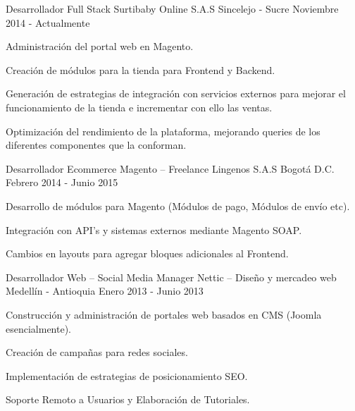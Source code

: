 

\begin{cventries}

  \cventry
    {Desarrollador Full Stack} %
    {Surtibaby Online S.A.S} %
    {Sincelejo - Sucre} %
    {Noviembre 2014 - Actualmente} %
    {
      \begin{cvitems} %
        \item {Administración del portal web en Magento.}
        \item {Creación de módulos para la tienda para Frontend y Backend.}
        \item {Generación de estrategias de integración con servicios externos para mejorar el
funcionamiento de la tienda e incrementar con ello las ventas.}
		\item {Optimización del rendimiento de la plataforma, mejorando queries de los diferentes
componentes que la conforman.}
      \end{cvitems}
    }

  \cventry
    {Desarrollador Ecommerce Magento – Freelance} %
    {Lingenos S.A.S} %
    {Bogotá D.C.} %
    {Febrero 2014 - Junio 2015} %
    {
      \begin{cvitems} %
        \item {Desarrollo de módulos para Magento (Módulos de pago, Módulos de envío etc).}
        \item {Integración con API's y sistemas externos mediante Magento SOAP.}
        \item {Cambios en layouts para agregar bloques adicionales al Frontend.}
      \end{cvitems}
    }

  \cventry
    {Desarrollador Web – Social Media Manager} %
    {Nettic – Diseño y mercadeo web} %
    {Medellín - Antioquia} %
    {Enero 2013 - Junio 2013} %
    {
      \begin{cvitems} %
        \item {Construcción y administración de portales web basados en CMS (Joomla
esencialmente).}
        \item {Creación de campañas para redes sociales.}
        \item {Implementación de estrategias de posicionamiento SEO.}
        \item {Soporte Remoto a Usuarios y Elaboración de Tutoriales.}
      \end{cvitems} 
    }


\end{cventries}
